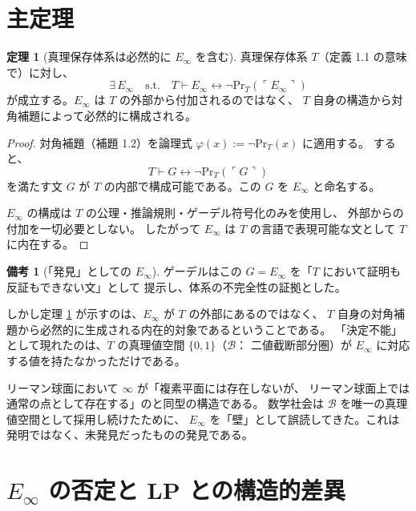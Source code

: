 \documentclass[11pt,a4paper]{article}
\theoremstyle{definition}
\newtheorem{theorem}{定理}[section]
\newtheorem{remark}{備考}[section]
\newcommand{\Bval}{\mathcal{B}}
\newcommand{\Einfty}{E_\infty}
\renewcommand{\Pr}{\mathrm{Pr}}
\begin{document}
\section{主定理}

\begin{theorem}[真理保存体系は必然的に $\Einfty$ を含む]
\label{thm:main}
真理保存体系 $T$（定義 1.1 の意味で）に対し、
$$\exists\, \Einfty \quad \text{s.t.} \quad
T \vdash \Einfty \leftrightarrow \neg \Pr_T(\ulcorner \Einfty \urcorner)$$
が成立する。$\Einfty$ は $T$ の外部から付加されるのではなく、
$T$ 自身の構造から対角補題によって必然的に構成される。
\end{theorem}

\begin{proof}
対角補題（補題 1.2）を論理式 $\varphi(x) := \neg \Pr_T(x)$ に適用する。
すると、
$$T \vdash G \leftrightarrow \neg \Pr_T(\ulcorner G \urcorner)$$
を満たす文 $G$ が $T$ の内部で構成可能である。この $G$ を $\Einfty$ と命名する。

$\Einfty$ の構成は $T$ の公理・推論規則・ゲーデル符号化のみを使用し、
外部からの付加を一切必要としない。
したがって $\Einfty$ は $T$ の言語で表現可能な文として $T$ に内在する。
\end{proof}

\begin{remark}[「発見」としての $\Einfty$]
ゲーデルはこの $G = \Einfty$ を「$T$ において証明も反証もできない文」として
提示し、体系の不完全性の証拠とした。

しかし定理 \ref{thm:main} が示すのは、$\Einfty$ が $T$ の外部にあるのではなく、
$T$ 自身の対角補題から必然的に生成される内在的対象であるということである。
「決定不能」として現れたのは、$T$ の真理値空間 $\{0, 1\}$（$\Bval$：
二値截断部分圏）が $\Einfty$ に対応する値を持たなかっただけである。

リーマン球面において $\infty$ が「複素平面には存在しないが、
リーマン球面上では通常の点として存在する」のと同型の構造である。
数学社会は $\Bval$ を唯一の真理値空間として採用し続けたために、
$\Einfty$ を「壁」として誤読してきた。これは発明ではなく、未発見だったものの発見である。
\end{remark}

\section{$\Einfty$ の否定と LP との構造的差異}
\end{document}
